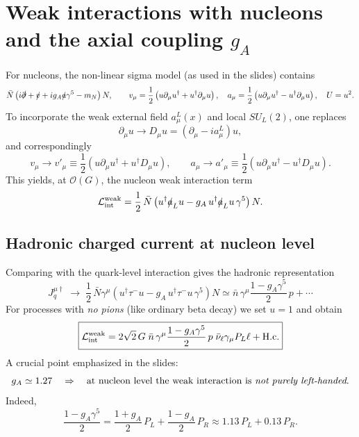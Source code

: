\section{Weak interactions with nucleons and the axial coupling $g_A$}
For nucleons, the non-linear sigma model (as used in the slides) contains
\begin{equation}
\bar N\left(
i\slashed{\partial}+\slashed{v}+i g_A \slashed{a}\gamma^5 - m_N
\right)N,
\qquad
v_\mu=\frac12\left(u\partial_\mu u^\dagger+u^\dagger\partial_\mu u\right),
\quad
a_\mu=\frac12\left(u\partial_\mu u^\dagger-u^\dagger\partial_\mu u\right),
\quad U=u^2.
\end{equation}
To incorporate the weak external field $a^L_\mu(x)$ and local $SU_L(2)$, one replaces
\begin{equation}
\partial_\mu u \to D_\mu u=(\partial_\mu-i a^L_\mu)u,
\end{equation}
and correspondingly
\begin{equation}
v_\mu\to v'_\mu\equiv \frac12\left(u\partial_\mu u^\dagger+u^\dagger D_\mu u\right),
\qquad
a_\mu\to a'_\mu\equiv \frac12\left(u\partial_\mu u^\dagger-u^\dagger D_\mu u\right).
\end{equation}
This yields, at $\mathcal{O}(G)$, the nucleon weak interaction term
\begin{equation}
\mathcal{L}^{\rm weak}_{\rm int}
=
\frac12\,\bar N\left(u^\dagger \slashed{a}_L u - g_A\,u^\dagger \slashed{a}_L u\,\gamma^5\right)N.
\end{equation}

\subsection{Hadronic charged current at nucleon level}
Comparing with the quark-level interaction gives the hadronic representation
\begin{equation}
J_q^{\mu\dagger}
\;\to\;
\frac12\,\bar N\gamma^\mu\left(u^\dagger\tau^- u - g_A\,u^\dagger\tau^- u\,\gamma^5\right)N
\simeq
\bar n\,\gamma^\mu\frac{1-g_A\gamma^5}{2}\,p+\cdots
\end{equation}
For processes with \emph{no pions} (like ordinary beta decay) we set $u=1$ and obtain
\begin{equation}
\boxed{
\mathcal{L}^{\rm weak}_{\rm int}
=
2\sqrt{2}\,G\;
\bar n\,\gamma^\mu\frac{1-g_A\gamma^5}{2}\,p\;
\bar\nu_\ell\gamma_\mu P_L \ell
+\text{H.c.}
}
\end{equation}
A crucial point emphasized in the slides:
\begin{equation}
g_A\simeq 1.27
\quad\Rightarrow\quad
\text{at nucleon level the weak interaction is \emph{not purely left-handed}.}
\end{equation}
Indeed,
\begin{equation}
\frac{1-g_A\gamma^5}{2}
=
\frac{1+g_A}{2}\,P_L+\frac{1-g_A}{2}\,P_R
\approx
1.13\,P_L+0.13\,P_R.
\end{equation}

